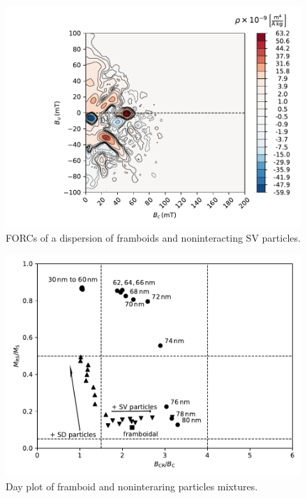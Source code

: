 \begin{figure}
\centering
\includegraphics[width=\textwidth]{research-4/figs/FORC_framAVG_SF4_mixed_vortex_ratio1.pdf}
\caption[FORCs of a dispersion of framboids and noninteracting SV particles]{FORCs of a dispersion of framboids and noninteracting SV particles.}
\label{FIG_13}
\end{figure}

\begin{figure}
\centering
\includegraphics[width=\textwidth]{research-4/figs/DayPlot.pdf}
\caption[Day plot of framboid and noninteraring particles mixtures]{Day plot of framboid and noninteraring particles mixtures.}
\label{FIG_14}
\end{figure}

